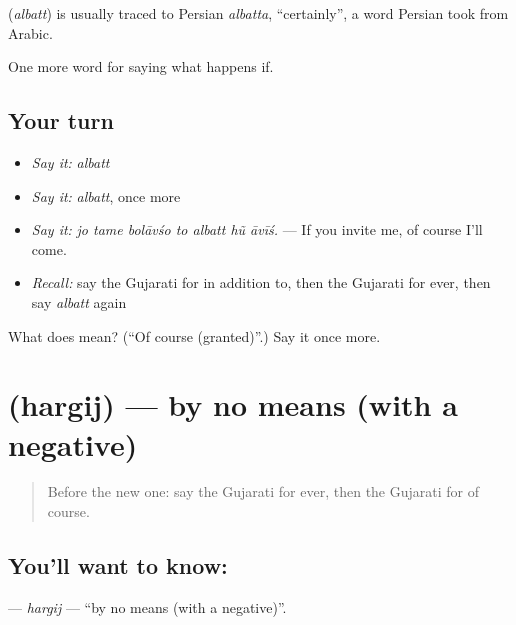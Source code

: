 \begin{cousinweb}
\textbf{} (\emph{albatt}) is usually traced to Persian \emph{albatta}, \textquotedblleft{}certainly\textquotedblright{}, a word Persian took from Arabic.
\end{cousinweb}

\begin{grammarlens}[title={What you've built}]
One more word for saying what happens if.
\end{grammarlens}

\subsection*{Your turn}
\begin{itemize}
\raggedright
  \item \emph{Say it:} \emph{albatt}
  \item \emph{Say it:} \emph{albatt}, once more
  \item \emph{Say it:} \emph{jo tame bolāvśo to albatt hũ āvīś.} — If you invite me, of course I'll come.
  \item \emph{Recall:} say the Gujarati for in addition to, then the Gujarati for ever, then say \emph{albatt} again
\end{itemize}

\begin{tcolorbox}[breakable,colback=teal!4,colframe=teal!35!black,title={Before you move on}]
What does  mean? (\textquotedblleft{}Of course (granted)\textquotedblright{}.) Say it once more.
\end{tcolorbox}
\section[\texorpdfstring{\gu{હરગિજ} (hargij)}{હરગિજ (hargij)}]{ (hargij) — by no means (with a negative)}

\label{lesson:GU-C547-hargij}



\begin{quote}
Before the new one: say the Gujarati for ever, then the Gujarati for of course.
\end{quote}

\subsection*{You'll want to know: }
\textbf{} — \emph{hargij} — \textquotedblleft{}by no means (with a negative)\textquotedblright{}.

